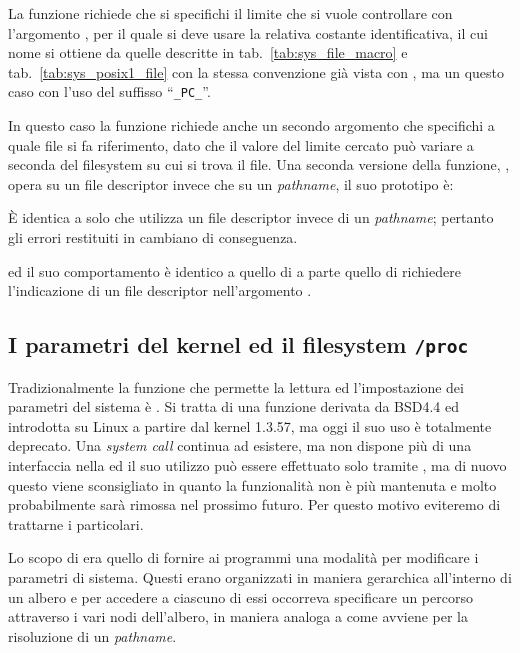 La funzione richiede che si specifichi il limite che si vuole controllare con
l'argomento , per il quale si deve usare la relativa costante
identificativa, il cui nome si ottiene da quelle descritte in
tab.~\ref{tab:sys_file_macro} e tab.~\ref{tab:sys_posix1_file} con la stessa
convenzione già vista con , ma un questo caso con l'uso del
suffisso ``\texttt{\_PC\_}''.

In questo caso la funzione richiede anche un secondo argomento 
che specifichi a quale file si fa riferimento, dato che il valore del limite
cercato può variare a seconda del filesystem su cui si trova il file. Una
seconda versione della funzione, , opera su un file
descriptor invece che su un \textit{pathname}, il suo prototipo è:

\begin{funcproto}{
}

{È identica a  solo che utilizza un file descriptor invece di
  un \textit{pathname}; pertanto gli errori restituiti in  cambiano
  di conseguenza.}
\end{funcproto}
\noindent ed il suo comportamento è identico a quello di  a
parte quello di richiedere l'indicazione di un file descriptor
nell'argomento .



\subsection{I parametri del kernel ed il filesystem \texttt{/proc}}
\label{sec:sys_sysctl}

Tradizionalmente la funzione che permette la lettura ed l'impostazione dei
parametri del sistema è . Si tratta di una funzione derivata da
BSD4.4 ed introdotta su Linux a partire dal kernel 1.3.57, ma oggi il suo uso
è totalmente deprecato.  Una \textit{system call}  continua ad
esistere, ma non dispone più di una interfaccia nella  ed il suo
utilizzo può essere effettuato solo tramite , ma di nuovo questo
viene sconsigliato in quanto la funzionalità non è più mantenuta e molto
probabilmente sarà rimossa nel prossimo futuro. Per questo motivo eviteremo di
trattarne i particolari.

Lo scopo di  era quello di fornire ai programmi una modalità per
modificare i parametri di sistema. Questi erano organizzati in maniera
gerarchica all'interno di un albero e per accedere a ciascuno di essi
occorreva specificare un percorso attraverso i vari nodi dell'albero, in
maniera analoga a come avviene per la risoluzione di un \textit{pathname}.

